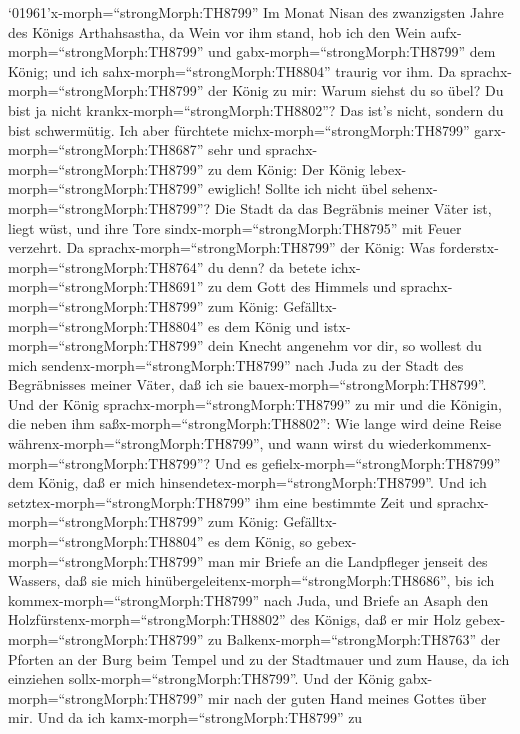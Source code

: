  `01961'\textbar x-morph=``strongMorph:TH8799'' Im Monat
Nisan des zwanzigsten Jahre des Königs Arthahsastha, da Wein vor ihm
stand, hob ich den Wein aufx-morph=``strongMorph:TH8799'' und
gabx-morph=``strongMorph:TH8799'' dem König; und ich
sahx-morph=``strongMorph:TH8804'' traurig vor ihm.  Da
sprachx-morph=``strongMorph:TH8799'' der König zu mir: Warum siehst du
so übel? Du bist ja nicht krankx-morph=``strongMorph:TH8802''? Das ist's
nicht, sondern du bist schwermütig. Ich aber fürchtete
michx-morph=``strongMorph:TH8799'' garx-morph=``strongMorph:TH8687''
sehr  und sprachx-morph=``strongMorph:TH8799'' zu dem König:
Der König lebex-morph=``strongMorph:TH8799'' ewiglich! Sollte ich nicht
übel sehenx-morph=``strongMorph:TH8799''? Die Stadt da das Begräbnis
meiner Väter ist, liegt wüst, und ihre Tore
sindx-morph=``strongMorph:TH8795'' mit Feuer verzehrt.  Da
sprachx-morph=``strongMorph:TH8799'' der König: Was
forderstx-morph=``strongMorph:TH8764'' du denn? da betete
ichx-morph=``strongMorph:TH8691'' zu dem Gott des Himmels 
und sprachx-morph=``strongMorph:TH8799'' zum König:
Gefälltx-morph=``strongMorph:TH8804'' es dem König und
istx-morph=``strongMorph:TH8799'' dein Knecht angenehm vor dir, so
wollest du mich sendenx-morph=``strongMorph:TH8799'' nach Juda zu der
Stadt des Begräbnisses meiner Väter, daß ich sie
bauex-morph=``strongMorph:TH8799''.  Und der König
sprachx-morph=``strongMorph:TH8799'' zu mir und die Königin, die neben
ihm saßx-morph=``strongMorph:TH8802'': Wie lange wird deine Reise
währenx-morph=``strongMorph:TH8799'', und wann wirst du
wiederkommenx-morph=``strongMorph:TH8799''? Und es
gefielx-morph=``strongMorph:TH8799'' dem König, daß er mich
hinsendetex-morph=``strongMorph:TH8799''. Und ich
setztex-morph=``strongMorph:TH8799'' ihm eine bestimmte Zeit
 und sprachx-morph=``strongMorph:TH8799'' zum König:
Gefälltx-morph=``strongMorph:TH8804'' es dem König, so
gebex-morph=``strongMorph:TH8799'' man mir Briefe an die Landpfleger
jenseit des Wassers, daß sie mich
hinübergeleitenx-morph=``strongMorph:TH8686'', bis ich
kommex-morph=``strongMorph:TH8799'' nach Juda,  und Briefe
an Asaph den Holzfürstenx-morph=``strongMorph:TH8802'' des Königs, daß
er mir Holz gebex-morph=``strongMorph:TH8799'' zu
Balkenx-morph=``strongMorph:TH8763'' der Pforten an der Burg beim Tempel
und zu der Stadtmauer und zum Hause, da ich einziehen
sollx-morph=``strongMorph:TH8799''. Und der König
gabx-morph=``strongMorph:TH8799'' mir nach der guten Hand meines Gottes
über mir.  Und da ich kamx-morph=``strongMorph:TH8799'' zu
